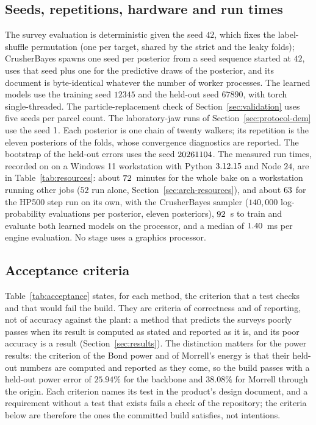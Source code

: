 \subsection{Seeds, repetitions, hardware and run times}\label{sec:protocol-seeds}

The survey evaluation is deterministic given the seed $42$, which fixes the label-shuffle permutation (one per target, shared by the strict
and the leaky folds); CrusherBayes spawns one seed per
posterior from a seed sequence started at $42$, uses that seed plus one for the predictive draws of the posterior, and its document is byte-identical whatever the number of worker
processes. The learned models use the training seed $12345$ and the held-out seed $67890$, with torch single-threaded. The
particle-replacement check of Section~\ref{sec:validation} uses five seeds per parcel count. The laboratory-jaw runs of Section~\ref{sec:protocol-dem} use the seed $1$. Each posterior is one chain of twenty walkers;
its repetition is the eleven posteriors of the folds, whose convergence diagnostics are reported. The bootstrap of the held-out errors uses the seed $20261104$. The measured run times, recorded on \resDate{} on a
Windows 11 workstation with Python $3.12.15$ and Node $24$, are in Table~\ref{tab:resources}: about $72$~minutes for the whole bake on a workstation running other jobs ($52$ run alone, Section~\ref{sec:arch-resources}),
and about $63$ for the HP500 step run on its own, with the CrusherBayes sampler ($140{,}000$ log-probability evaluations per posterior, eleven
posteriors), $92$~s to train and evaluate both learned models on the processor, and a median of $1.40$~ms per engine
evaluation. No stage uses a graphics processor.

\subsection{Acceptance criteria}\label{sec:protocol-acceptance}

Table~\ref{tab:acceptance} states, for each method, the criterion that a test checks and that would fail the build. They are criteria of
correctness and of reporting, not of accuracy against the plant: a method that predicts the surveys poorly passes when its result is computed
as stated and reported as it is, and its poor accuracy is a result (Section~\ref{sec:results}). The distinction matters for the power
results: the criterion of the Bond power and of Morrell's energy is that their held-out numbers are computed and reported as they come, so the
build passes with a held-out power error of $25.94\%$ for the backbone and $38.08\%$ for Morrell through the origin. Each criterion names its
test in the product's design document, and a requirement without a test that exists fails a check of the repository; the criteria below are
therefore the ones the committed build satisfies, not intentions.

